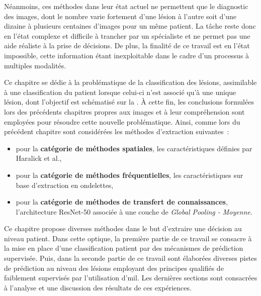 Néanmoins, ces méthodes dans leur état actuel ne permettent que le diagnostic des images, dont le nombre varie fortement d'une lésion à l'autre soit d'une dizaine à plusieurs centaines d'images pour un même patient. La tâche reste donc en l'état complexe et difficile à trancher par un spécialiste et ne permet pas une aide réaliste à la prise de décisions. De plus, la finalité de ce travail est en l'état impossible, cette information étant inexploitable dans le cadre d'un processus à multiples modalités.\par

Ce chapitre se dédie à la problématique de la classification des lésions, assimilable à une classification du patient lorsque celui-ci n'est associé qu'à une unique lésion, dont l'objectif est schématisé sur la . À cette fin, les conclusions formulées lors des précédents chapitres propres aux images et à leur compréhension sont employées pour résoudre cette nouvelle problématique. Ainsi, comme lors du précédent chapitre sont considérées les méthodes d'extraction suivantes~:
\begin{itemize}
    \item pour la \textbf{catégorie de méthodes spatiales}, les caractéristiques définies par Haralick et al.\cite{Haralick1973},
    \item pour la \textbf{catégorie de méthodes fréquentielles}, les caractéristiques sur base d'extraction en ondelettes,
    \item pour la \textbf{catégorie de méthodes de transfert de connaissances}, l'architecture ResNet-50 associée à une couche de \textit{Global Pooling - Moyenne}.
\end{itemize}\par\par

Ce chapitre propose diverses méthodes dans le but d'extraire une décision au niveau patient. Dans cette optique, la première partie de ce travail se consacre à la mise en place d'une classification patient par des mécanismes de prédiction supervisée. Puis, dans la seconde partie de ce travail sont élaborées diverses pistes de prédiction au niveau des lésions employant des principes qualifiés de faiblement supervisés par l'utilisation d'\gls{mil}. Les dernières sections sont consacrées à l'analyse et une discussion des résultats de ces expériences.\par

